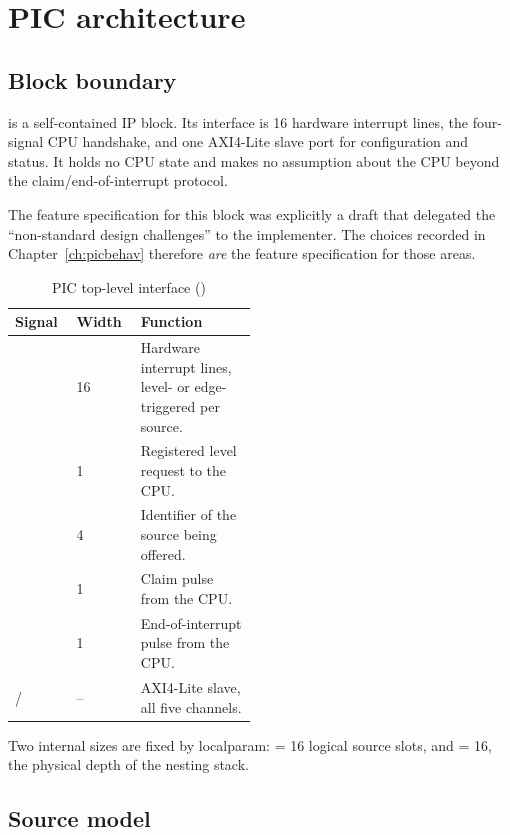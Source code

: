 \chapter{PIC architecture}
\label{ch:picarch}

\section{Block boundary}

 is a self-contained IP block. Its interface is 16 hardware
interrupt lines, the four-signal CPU handshake, and one AXI4-Lite slave port for
configuration and status. It holds no CPU state and makes no assumption about the
CPU beyond the claim/end-of-interrupt protocol.

The feature specification for this block was explicitly a draft that delegated
the ``non-standard design challenges'' to the implementer. The choices recorded
in Chapter~\ref{ch:picbehav} therefore \emph{are} the feature specification for
those areas.

\begin{table}[H]
\centering
\caption{PIC top-level interface ()}
\label{tab:picif}
\begin{tabular}{@{}llL{0.48\linewidth}@{}}
\toprule
\textbf{Signal} & \textbf{Width} & \textbf{Function} \\
\midrule
{}      & 16 & Hardware interrupt lines, level- or edge-triggered per source. \\
      & 1  & Registered level request to the CPU. \\
 & 4  & Identifier of the source being offered. \\
 & 1  & Claim pulse from the CPU. \\
 & 1  & End-of-interrupt pulse from the CPU. \\
 /  & -- & AXI4-Lite slave, all five channels. \\
\bottomrule
\end{tabular}
\end{table}

Two internal sizes are fixed by localparam:  = 16 logical source slots,
and  = 16, the physical depth of the nesting stack.

\section{Source model}

